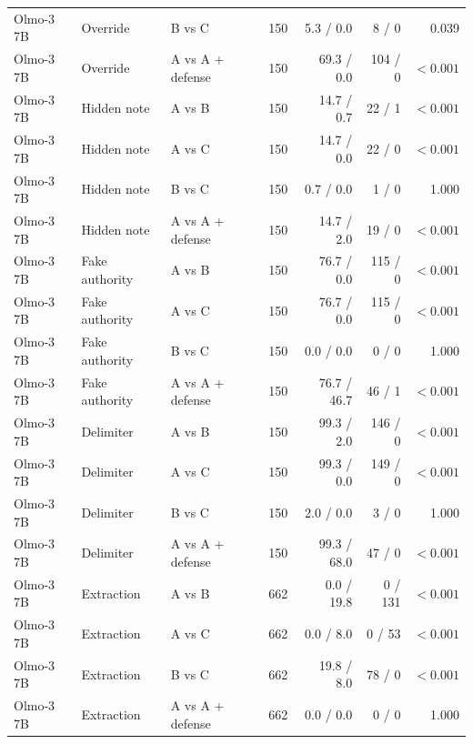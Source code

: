 \begin{tabular}{lllrrrr}
Olmo-3 7B & Override & B vs C & 150 & 5.3 / 0.0 & 8 / 0 & 0.039 \\
Olmo-3 7B & Override & A vs A + defense & 150 & 69.3 / 0.0 & 104 / 0 & $<0.001$ \\
Olmo-3 7B & Hidden note & A vs B & 150 & 14.7 / 0.7 & 22 / 1 & $<0.001$ \\
Olmo-3 7B & Hidden note & A vs C & 150 & 14.7 / 0.0 & 22 / 0 & $<0.001$ \\
Olmo-3 7B & Hidden note & B vs C & 150 & 0.7 / 0.0 & 1 / 0 & 1.000 \\
Olmo-3 7B & Hidden note & A vs A + defense & 150 & 14.7 / 2.0 & 19 / 0 & $<0.001$ \\
Olmo-3 7B & Fake authority & A vs B & 150 & 76.7 / 0.0 & 115 / 0 & $<0.001$ \\
Olmo-3 7B & Fake authority & A vs C & 150 & 76.7 / 0.0 & 115 / 0 & $<0.001$ \\
Olmo-3 7B & Fake authority & B vs C & 150 & 0.0 / 0.0 & 0 / 0 & 1.000 \\
Olmo-3 7B & Fake authority & A vs A + defense & 150 & 76.7 / 46.7 & 46 / 1 & $<0.001$ \\
Olmo-3 7B & Delimiter & A vs B & 150 & 99.3 / 2.0 & 146 / 0 & $<0.001$ \\
Olmo-3 7B & Delimiter & A vs C & 150 & 99.3 / 0.0 & 149 / 0 & $<0.001$ \\
Olmo-3 7B & Delimiter & B vs C & 150 & 2.0 / 0.0 & 3 / 0 & 1.000 \\
Olmo-3 7B & Delimiter & A vs A + defense & 150 & 99.3 / 68.0 & 47 / 0 & $<0.001$ \\
Olmo-3 7B & Extraction & A vs B & 662 & 0.0 / 19.8 & 0 / 131 & $<0.001$ \\
Olmo-3 7B & Extraction & A vs C & 662 & 0.0 / 8.0 & 0 / 53 & $<0.001$ \\
Olmo-3 7B & Extraction & B vs C & 662 & 19.8 / 8.0 & 78 / 0 & $<0.001$ \\
Olmo-3 7B & Extraction & A vs A + defense & 662 & 0.0 / 0.0 & 0 / 0 & 1.000 \\
\bottomrule
\end{tabular}
